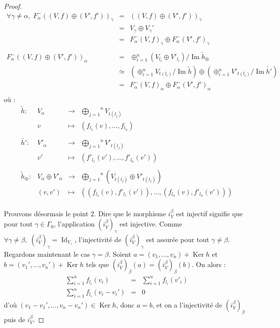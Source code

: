\documentclass[a4paper,10pt]{article}
\DeclareMathOperator{\Ker}{Ker}
\DeclareMathOperator{\Id}{Id}
\DeclareMathOperator{\Img}{Im}
\begin{document}
\begin{proof}
\[
\begin{array}{rll}
	\forall\gamma\neq\alpha,\;F_{\alpha}^{-}((V,f)\oplus(V',f'))_{\gamma}&=&((V,f)\oplus(V',f'))_{\gamma}\\
	&=& V_{\gamma}\oplus V_{\gamma}'\\
	&=&  F_{\alpha}^{-}(V,f)_{\gamma}\oplus F_{\alpha}^{-}(V',f')_{\gamma}\\
	&&\\
	F_{\alpha}^{-}((V,f)\oplus(V',f'))_{\alpha}&=&\oplus_{i=1}^{n}\left(V_{l_{i}} \oplus V'_{l_{i}}\right)/ \Img \tilde{h}_{\oplus} \\
	&\simeq& \left( \oplus_{i=1}^{n}V_{t(l_{i})} / \Img \tilde{h} \right) \oplus  \left( \oplus_{i=1}^{n}V'_{t(l_{i})} / \Img \tilde{h'} \right)\\
	&=&  F_{\alpha}^{-}(V,f)_{\alpha}\oplus F_{\alpha}^{-}(V',f')_{\alpha}\\
\end{array}
\] 
où :
\[
\begin{array}{lccc}
	\tilde{h} : & V_{\alpha} &\rightarrow & \overset{n}{\underset{j=1}{\bigoplus}}V_{t(l_{j})} \\ 
	& v&\mapsto & \left(f_{l_{1}}(v), \dots, f_{l_{n}}\right)\\
	&&&\\
	\tilde{h'} : & V'_{\alpha} &\rightarrow & \overset{n}{\underset{j=1}{\bigoplus}}V'_{t(l_{j})} \\ 
	& v'&\mapsto & \left(f'_{l_{1}}(v'), \dots, f'_{l_{n}}(v')\right)\\
	&&&\\
	\tilde{h}_{\oplus} : &V_{\alpha} \oplus V'_{\alpha} &\rightarrow & \overset{n}{\underset{j=1}{\bigoplus}}(V_{t(l_{j})} \oplus V'_{t(l_{j})}) \\ 
	& (v,v') &\mapsto & \left((f_{l_{1}}(v),f'_{l_{1}}(v')), \dots, (f_{l_{n}}(v),f'_{l_{n}}(v'))\right)\\
\end{array}
	\]


	Prouvons désormais le point $2$. Dire que le morphisme $i_{V}^{\beta}$ est injectif signifie que pour tout $\gamma\in\Gamma_{0}$, l'application $(i_{V}^{\beta})_{\gamma}$ est injective. Comme $\forall\gamma\neq\beta,\;(i_{V}^{\beta})_{\gamma}=\Id_{V_{\gamma}}$, l'injectivité de $(i_{V}^{\beta})_{\gamma}$ est assurée pour tout $\gamma\neq\beta$. Regardons maintenant le cas $\gamma=\beta$. Soient $a=(v_{1},\dots,v_{n})+\Ker h$ et $b=(v_{1}',\dots,v_{n}')+\Ker h$ tels que $(i_{V}^{\beta})_{\beta}(a)=(i_{V}^{\beta})_{\beta}(b)$. On alors :
	\[
\begin{array}{rll}
	\sum_{i=1}^{n}f_{l_{i}}(v_{i})&=&\sum_{i=1}^{n}f_{l_{i}}(v'_{i})\\
	\sum_{i=1}^{n}f_{l_{i}}(v_{i}-v_{i}')&=&0
\end{array}
	\]
	d'où $(v_{1}-v_{1}',\dots,v_{n}-v_{n}')\in\Ker h$, donc $a=b$, et on a l'injectivité de $(i_{V}^{\beta})_{\beta}$ puis de $i_{V}^{\beta}$.



\end{proof}
\end{document}
